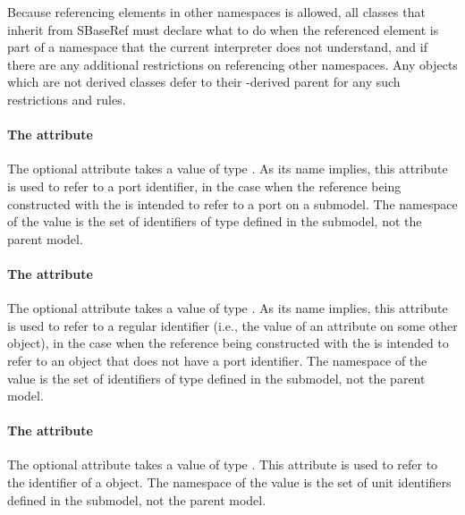 Because referencing elements in other namespaces is allowed, all classes that
inherit from SBaseRef must declare what to do when the referenced element
is part of a namespace that the current interpreter does not understand, and
if there are any additional restrictions on referencing other namespaces.  Any
\SBaseRef objects which are not derived classes defer to their \SBaseRef-derived
parent for any such restrictions and rules.

\paragraph{The \fixttspace{} attribute}
\label{sbaseref-portref}

The optional attribute  takes a value of type
.  As its name implies, this attribute is used to
refer to a port identifier, in the case when the reference being
constructed with the \SBaseRef is intended to refer to a port on a
submodel.  The namespace of the  value is the set
of identifiers of type  defined in the submodel, not
the parent model.


\paragraph{The \fixttspace{} attribute}
\label{sbaseref-idref}

The optional attribute  takes a value of type
.  As its name implies, this attribute is used to
refer to a regular identifier (i.e., the value of an 
attribute on some other object), in the case when the reference being
constructed with the \SBaseRef is intended to refer to an object that
does not have a port identifier.  The namespace of the 
value is the set of identifiers of type  defined in the
submodel, not the parent model.


\paragraph{The \fixttspace{} attribute}
\label{sbaseref-unitref}

The optional attribute  takes a value of type
.  This attribute is used to refer to the identifier
of a \UnitDefinition object.  The namespace of the 
value is the set of unit identifiers defined in the submodel, not the
parent model.

